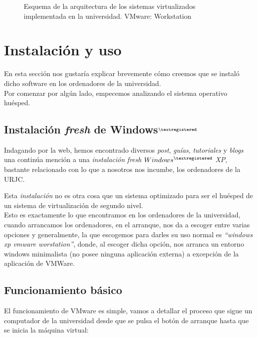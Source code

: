 \begin{figure}[H]
\begin{center}
\end{center}
\caption[Arquitectura VMware: Workstation]{Esquema de la arquitectura de los sistemas virtualizados implementada en la universidad. VMware: Workstation}
\end{figure}

\section{Instalación y uso}
En esta sección nos gustaría explicar brevemente cómo creemos que se instaló dicho software en los ordenadores de la universidad.\\

Por comenzar por algún lado, empecemos analizando el sistema operativo huésped\cite{vmwareinst}\cite{vmwareinst2}.\\

\subsection{Instalación \emph{fresh} de Windows$^{\textregistered}$}
Indagando por la web, hemos encontrado diversos \emph{post}, \emph{guías}, \emph{tutoriales} y \emph{blogs} una continúa mención a una \emph{instalación fresh $Windows^{\textregistered}$ XP}, bastante relacionado con lo que a nosotros nos incumbe, los ordenadores de la URJC.

Esta \emph{instalación} no es otra cosa que un sistema optimizado para ser el huésped de un sistema de virtualización de segundo nivel.\\

Esto es exactamente lo que encontramos en los ordenadores de la universidad, cuando arrancamos los ordenadores, en el arranque, nos da a escoger entre varias opciones y generalmente, la que escogemos para darles su uso normal es \emph{\textquotedblleft windows xp vmware worstation\textquotedblright}, donde, al escoger dicha opción, nos arranca un entorno windows minimalista (no posee ninguna aplicación externa) a excepción de la aplicación de VMWare.

\subsection{Funcionamiento básico}

El funcionamiento de VMware es simple, vamos a detallar el proceso que sigue un computador de la universidad desde que se pulsa el botón de arranque hasta que se inicia la máquina virtual:


